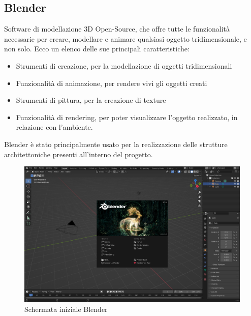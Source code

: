 \documentclass[10pt,a4paper]{article}
\begin{document}
    \subsection{Blender}
    Software di modellazione 3D Open-Source, che offre tutte le funzionalità necessarie per creare, modellare e animare qualsiasi oggetto tridimensionale, e non solo. Ecco un elenco delle sue principali caratteristiche:
    \begin{itemize}
    	\item Strumenti di creazione, per la modellazione di oggetti tridimensionali
    	\item Funzionalità di animazione, per rendere vivi gli oggetti creati
        \item Strumenti di pittura, per la creazione di texture
    	\item Funzionalità di rendering, per poter visualizzare l'oggetto realizzato, in relazione con l'ambiente.
    \end{itemize}
    Blender è stato principalmente usato per la realizzazione delle strutture architettoniche presenti all'interno del progetto.
    \begin{figure}[H]
    	\centering
    	\includegraphics[width=0.7\linewidth]{image/blender}
    	\caption{Schermata iniziale Blender}
    	\label{fig:Blender}
    \end{figure}
\end{document}
